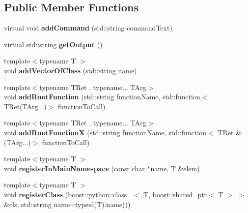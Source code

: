 \subsection*{Public Member Functions}
\begin{DoxyCompactItemize}
\item 
virtual void {\bfseries add\+Command} (std\+::string command\+Text)\hypertarget{classPythonModule_a378abef34655e389f725596e4c181963}{}\label{classPythonModule_a378abef34655e389f725596e4c181963}

\item 
virtual std\+::string {\bfseries get\+Output} ()\hypertarget{classPythonModule_abd74fe3976d219cd770204ecadc119d8}{}\label{classPythonModule_abd74fe3976d219cd770204ecadc119d8}

\item 
{\footnotesize template$<$typename T $>$ }\\void {\bfseries add\+Vector\+Of\+Class} (std\+::string name)\hypertarget{classPythonModule_aa53de4b364c6073213aebe3ebff7513c}{}\label{classPythonModule_aa53de4b364c6073213aebe3ebff7513c}

\item 
{\footnotesize template$<$typename T\+Ret , typename... T\+Arg$>$ }\\void {\bfseries add\+Root\+Function} (std\+::string function\+Name, std\+::function$<$ T\+Ret(T\+Arg...)$>$ function\+To\+Call)\hypertarget{classPythonModule_a09e46d74d919b4efc4e445260a18aaf6}{}\label{classPythonModule_a09e46d74d919b4efc4e445260a18aaf6}

\item 
{\footnotesize template$<$typename T\+Ret , typename... T\+Arg$>$ }\\void {\bfseries add\+Root\+FunctionX} (std\+::string function\+Name, std\+::function$<$ T\+Ret \&(T\+Arg...)$>$ function\+To\+Call)\hypertarget{classPythonModule_a618f419ae775e55b3d73ca7f54330b8b}{}\label{classPythonModule_a618f419ae775e55b3d73ca7f54330b8b}

\item 
{\footnotesize template$<$typename T $>$ }\\void {\bfseries register\+In\+Main\+Namespace} (const char $\ast$name, T \&elem)\hypertarget{classPythonModule_a68deee05f7ed1412d8c389bbfc65ac0d}{}\label{classPythonModule_a68deee05f7ed1412d8c389bbfc65ac0d}

\item 
{\footnotesize template$<$typename T $>$ }\\void {\bfseries register\+Class} (boost\+::python\+::class\+\_\+$<$ T, boost\+::shared\+\_\+ptr$<$ T $>$ $>$ \&cls, std\+::string name=typeid(T).name())\hypertarget{classPythonModule_a481fa85d1c7e27bb4513757b9e094f00}{}\label{classPythonModule_a481fa85d1c7e27bb4513757b9e094f00}

\end{DoxyCompactItemize}
